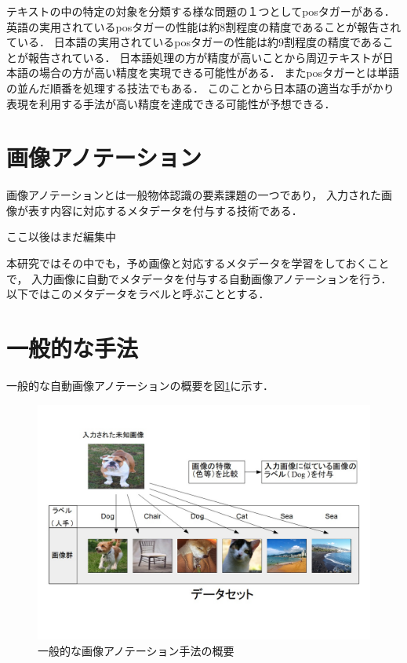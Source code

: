 テキストの中の特定の対象を分類する様な問題の１つとしてposタガーがある．
英語の実用されているposタガーの性能は約8割程度の精度であることが報告されている\cite{BirdKleinLoper09,Ibanez:2011:EPS:1964799.1964819}．
日本語の実用されているposタガーの性能は約9割程度の精度であることが報告されている\cite{UniDicJp2010}．
日本語処理の方が精度が高いことから周辺テキストが日本語の場合の方が高い精度を実現できる可能性がある．
またposタガーとは単語の並んだ順番を処理する技法でもある．
このことから日本語の適当な手がかり表現を利用する手法が高い精度を達成できる可能性が予想できる．


\section{画像アノテーション}
画像アノテーションとは一般物体認識の要素課題の一つであり，
入力された画像が表す内容に対応するメタデータを付与する技術である．


ここ以後はまだ編集中


本研究ではその中でも，予め画像と対応するメタデータを学習をしておくことで，
入力画像に自動でメタデータを付与する自動画像アノテーションを行う．
以下ではこのメタデータをラベルと呼ぶこととする．

\section{一般的な手法}
一般的な自動画像アノテーションの概要を図\ref{fig:abst}に示す．

\begin{figure}[tb]
 \begin{center}
  \includegraphics[scale=0.50]{gaiyou.jpg}
 \end{center}
 \caption{一般的な画像アノテーション手法の概要}
 \label{fig:abst}
\end{figure}

